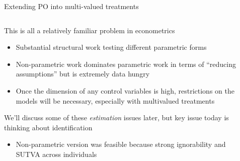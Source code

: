 \documentclass[notes,11pt, aspectratio=169]{beamer}
\newenvironment{wideitemize}{\itemize\addtolength{\itemsep}{10pt}}{\enditemize}
\begin{document}
\begin{frame}{Extending PO into multi-valued treatments}
\begin{columns}[T] %
  \begin{column}{.75\textwidth}
    \begin{wideitemize}
    \item This is all a relatively familiar problem in econometrics
      \begin{itemize}
      \item Substantial structural work testing different parametric forms
      \item Non-parametric work dominates parametric work in terms of
        ``reducing assumptions'' but is extremely data hungry
      \item Once the dimension of any control variables is high,
        restrictions on the models will be necessary, especially with
        multivalued treatments
      \end{itemize}
    \item We'll discuss some of these \emph{estimation} issues later, but  key issue today is thinking about identification
      \begin{itemize}
      \item Non-parametric version was feasible because strong ignorability and SUTVA across individuals
      \end{itemize}
  \end{wideitemize}    

\end{column}%
  \hfill%
  \begin{column}{.5\textwidth}
  \end{column}
\end{columns}
\end{frame}
\end{document}
